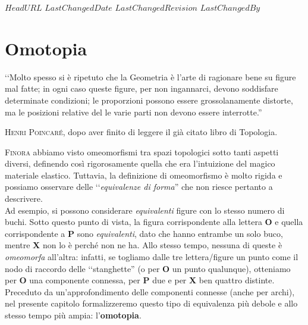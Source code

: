 \svnidlong
{$HeadURL$}
{$LastChangedDate$}
{$LastChangedRevision$}
{$LastChangedBy$}

\chapter{Omotopia}

\begin{introduction}
	‘‘Molto spesso si è ripetuto che la Geometria è l'arte di ragionare bene su figure mal fatte; in ogni caso queste figure, per non ingannarci, devono soddisfare determinate condizioni; le proporzioni
	possono essere grossolanamente distorte, ma le posizioni relative del
	le varie parti non devono essere interrotte.''
	\begin{flushright}
		\textsc{Henri Poincaré,} dopo aver finito di leggere il già citato libro di Topologia.
	\end{flushright}
\end{introduction}
\lettrine[findent=1pt, nindent=0pt]{F}{inora} abbiamo visto omeomorfismi tra spazi topologici sotto tanti aspetti diversi, definendo così rigorosamente quella che era l'intuizione del magico materiale elastico. Tuttavia, la definizione di omeomorfismo è molto rigida e possiamo osservare delle ‘‘\textit{equivalenze di forma}'' che non riesce pertanto a descrivere.\\
Ad esempio, si possono considerare \textit{equivalenti} figure con lo stesso numero di buchi. Sotto questo punto di vista, la figura corrispondente alla lettera \textsf{\textbf{O}} e quella corrispondente a \textsf{\textbf{P}} sono \textit{equivalenti}, dato che hanno entrambe un solo buco, mentre \textsf{\textbf{X}} non lo è perché non ne ha. Allo stesso tempo, nessuna di queste è \textit{omeomorfa} all'altra: infatti, se togliamo dalle tre lettera/figure un punto come il nodo di raccordo delle ‘‘stanghette'' (o per \textsf{\textbf{O}} un punto qualunque), otteniamo per \textsf{\textbf{O}} una componente connessa, per \textsf{\textbf{P}} due e per \textsf{\textbf{X}} ben quattro distinte.\\
Preceduto da un'approfondimento delle componenti connesse (anche per archi), nel presente capitolo formalizzeremo questo tipo di equivalenza più debole e allo stesso tempo più ampia: l'\textbf{omotopia}.
